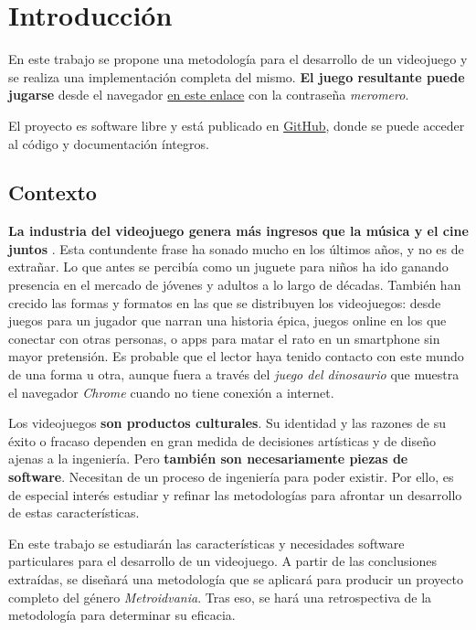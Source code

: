 \chapter{Introducción}

En este trabajo se propone una metodología para el desarrollo de un videojuego y se realiza una implementación completa del mismo. \textbf{El juego resultante puede jugarse} desde el navegador \href{https://pavro-o.itch.io/mero-mero}{en este enlace} con la contraseña \textit{meromero}.

El proyecto es software libre y está publicado en \href{https://github.com/pabloMillanCb/tfm}{GitHub}, donde se puede acceder al código y documentación íntegros.

\section{Contexto} 

\textbf{La industria del videojuego genera más ingresos que la música y el cine juntos} \cite{gamingisbigger}. Esta contundente frase ha sonado mucho en los últimos años, y no es de extrañar. Lo que antes se percibía como un juguete para niños ha ido ganando presencia en el mercado de jóvenes y adultos a lo largo de décadas. También han crecido las formas y formatos en las que se distribuyen los videojuegos: desde juegos para un jugador que narran una historia épica, juegos online en los que conectar con otras personas, o apps para matar el rato en un smartphone sin mayor pretensión. Es probable que el lector haya tenido contacto con este mundo de una forma u otra, aunque fuera a través del \textit{juego del dinosaurio} que muestra el navegador \textit{Chrome} cuando no tiene conexión a internet.

Los videojuegos \textbf{son productos culturales}. Su identidad y las razones de su éxito o fracaso dependen en gran medida de decisiones artísticas y de diseño ajenas a la ingeniería. Pero \textbf{también son necesariamente piezas de software}. Necesitan de un proceso de ingeniería para poder existir. Por ello, es de especial interés estudiar y refinar las metodologías para afrontar un desarrollo de estas características. 

En este trabajo se estudiarán las características y necesidades software particulares para el desarrollo de un videojuego. A partir de las conclusiones extraídas, se diseñará una metodología que se aplicará para producir un proyecto completo del género \textit{Metroidvania}. Tras eso, se hará una retrospectiva de la metodología para determinar su eficacia.


